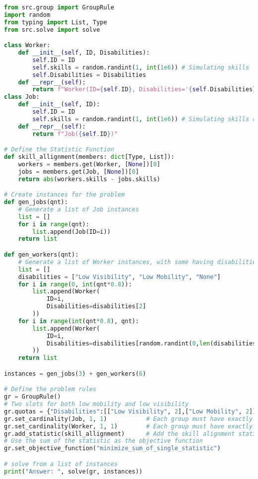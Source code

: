 \begin{lstlisting}[language=Python, caption={Creating and solving a Fair Matching Problem using this framework.}, label={script:fair_bipartite_matching}]
from src.group import GroupRule
import random
from typing import List, Type
from src.solve import solve

class Worker:
    def __init__(self, ID, Disabilities):
        self.ID = ID
        self.skills = random.randint(1, int(1e6)) # Simulating skills
        self.Disabilities = Disabilities
    def __repr__(self):
        return f"Worker(ID={self.ID}, Disabilities='{self.Disabilities}')"
class Job:
    def __init__(self, ID):
        self.ID = ID
        self.skills = random.randint(1, int(1e6)) # Simulating skills required
    def __repr__(self):
        return f"Job({self.ID})"

# Define the Statistic Function
def skill_allignment(members: dict[Type, List]):
    workers = members.get(Worker, [None])[0]
    jobs = members.get(Job, [None])[0]
    return abs(workers.skills - jobs.skills)

# Create instances for the problem
def gen_jobs(qnt):
    # Generate a list of Job instances
    list = []
    for i in range(qnt):
        list.append(Job(ID=i))
    return list

def gen_workers(qnt):
    # Generate a list of Worker instances, with some having disabilities
    list = []
    disabilities = ["Low Visibility", "Low Mobility", "None"]
    for i in range(0, int(qnt*0.8)):
        list.append(Worker(
            ID=i,
            Disabilities=disabilities[2]
        ))
    for i in range(int(qnt*0.8), qnt):
        list.append(Worker(
            ID=i,
            Disabilities=disabilities[random.randint(0,len(disabilities)-1)]
        ))
    return list

instances = gen_jobs(3) + gen_workers(6)

# Define the problem rules  
gr = GroupRule()
# Two slots for both low mobility and low visibility
gr.quotas = {"Disabilities":[["Low Visibility", 2],["Low Mobility", 2]]}
gr.set_cardinality(Job, 1, 1)           # Each group must have exactly 1 job
gr.set_cardinality(Worker, 1, 1)        # Each group must have exactly 1 worker
gr.add_statistic(skill_allignment)      # Add the skill alignment statistic
# Use the sum of the statistic as the objective function
gr.set_objective_function("minimize_sum_of_single_statistic")  

# solve from a list of instances
print("Answer: ", solve(gr, instances))
\end{lstlisting}